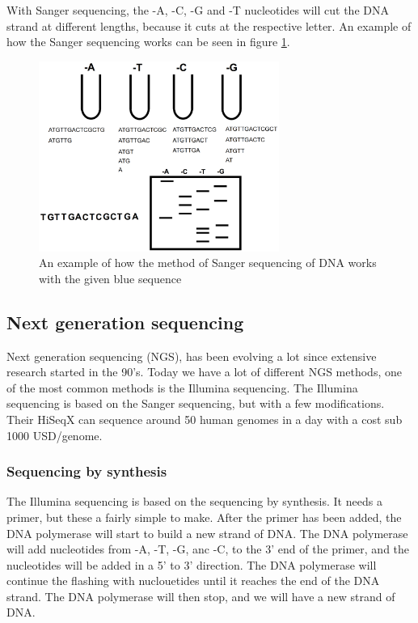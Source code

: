 With Sanger sequencing, the -A, -C, -G and -T nucleotides will cut the DNA strand at different lengths, because it cuts at the respective letter. An example of how the Sanger sequencing works can be seen in figure \ref{fig:SangerSequencing}.

\begin{figure}[h]
    \centering
    \includegraphics[width=0.7\textwidth]{Figures/SangerExample.png}
    \caption{An example of how the method of Sanger sequencing of DNA works with the given blue sequence}
    \label{fig:SangerSequencing}
\end{figure}



\subsection{Next generation sequencing}
Next generation sequencing (NGS), has been evolving a lot since extensive research started in the 90's. Today we have a lot of different NGS methods, one of the most common methods is the Illumina sequencing. The Illumina sequencing is based on the Sanger sequencing, but with a few modifications. Their HiSeqX can sequence around 50 human genomes in a day with a cost sub 1000 USD/genome.

\subsubsection{Sequencing by synthesis}
The Illumina sequencing is based on the sequencing by synthesis. It needs a primer, but these a fairly simple to make. 
After the primer has been added, the DNA polymerase will start to build a new strand of DNA. The DNA polymerase will add nucleotides from -A, -T, -G, anc -C, to the 3' end of the primer, and the nucleotides will be added in a 5' to 3' direction. The DNA polymerase will continue the flashing with nuclouetides until it reaches the end of the DNA strand. The DNA polymerase will then stop, and we will have a new strand of DNA. 

